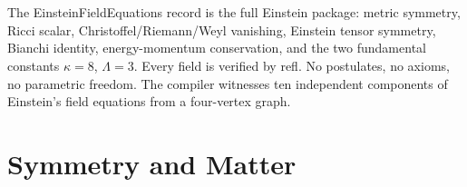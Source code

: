 \documentclass[11pt,a4paper]{book}
\def\texttt#1{#1}%
\newcommand{\VoidRef}[2]{\textit{#2} (in \textit{Void})}
\begin{document}
\begin{code}
\AgdaSpace{}%
\AgdaSymbol{=}\AgdaSpace{}%
\<%
\\
%
\>[4]\AgdaSymbol{;}\AgdaSpace{}%
%
\>[26]\AgdaSymbol{=}\AgdaSpace{}%
\<%
\\
%
\>[4]\AgdaSymbol{;}\AgdaSpace{}%
%
\>[26]\AgdaSymbol{=}\AgdaSpace{}%
\<%
\\
%
\>[4]\AgdaSymbol{;}\AgdaSpace{}%
%
\>[26]\AgdaSymbol{=}\AgdaSpace{}%
\<%
\\
%
\>[4]\AgdaSymbol{;}\AgdaSpace{}%
%
\>[26]\AgdaSymbol{=}\AgdaSpace{}%
\<%
\\
%
\>[4]\AgdaSymbol{;}\AgdaSpace{}%
\AgdaSpace{}%
\AgdaSymbol{=}\AgdaSpace{}%
\<%
\\
%
\>[4]\AgdaSymbol{;}\AgdaSpace{}%
%
\>[26]\AgdaSymbol{=}\AgdaSpace{}%
\<%
\\
%
\>[4]\AgdaSymbol{;}\AgdaSpace{}%
%
\>[26]\AgdaSymbol{=}\AgdaSpace{}%
\AgdaSpace{}%
\AgdaSymbol{\}}\<%
\end{code}

The \texttt{EinsteinFieldEquations} record is the full Einstein package: metric symmetry, Ricci scalar, Christoffel/Riemann/Weyl vanishing, Einstein tensor symmetry, Bianchi identity, energy-momentum conservation, and the two fundamental constants $\kappa = 8$, $\Lambda = 3$. Every field is verified by \texttt{refl}. No postulates, no axioms, no parametric freedom. The compiler witnesses ten independent components of Einstein's field equations from a four-vertex graph.


\part{Symmetry and Matter}
\label{part:symmetry-matter}

\end{document}
